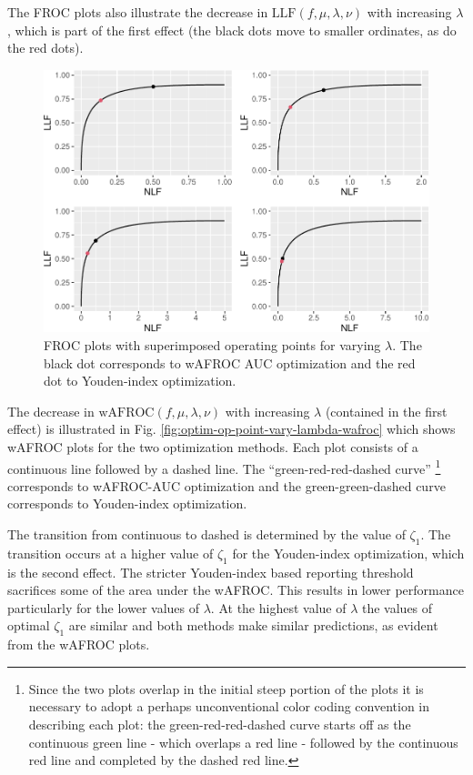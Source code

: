 \documentclass[
]{book}
\begin{document}
The FROC plots also illustrate the decrease in \(\text{LLF} \left ( f, \mu, \lambda, \nu \right )\) with increasing \(\lambda\), which is part of the first effect (the black dots move to smaller ordinates, as do the red dots).

\begin{figure}
\centering
\includegraphics{21-optim-op-point_files/figure-latex/optim-op-point-vary-lambda-froc-1.pdf}
\caption{\label{fig:optim-op-point-vary-lambda-froc}FROC plots with superimposed operating points for varying \(\lambda\). The black dot corresponds to wAFROC AUC optimization and the red dot to Youden-index optimization.}
\end{figure}

The decrease in \(\text{wAFROC} \left ( f, \mu, \lambda, \nu \right )\) with increasing \(\lambda\) (contained in the first effect) is illustrated in Fig. \ref{fig:optim-op-point-vary-lambda-wafroc} which shows wAFROC plots for the two optimization methods. Each plot consists of a continuous line followed by a dashed line. The ``green-red-red-dashed curve'' \footnote{Since the two plots overlap in the initial steep portion of the plots it is necessary to adopt a perhaps unconventional color coding convention in describing each plot: the green-red-red-dashed curve starts off as the continuous green line - which overlaps a red line - followed by the continuous red line and completed by the dashed red line.} corresponds to wAFROC-AUC optimization and the green-green-dashed curve corresponds to Youden-index optimization.

The transition from continuous to dashed is determined by the value of \(\zeta_1\). The transition occurs at a higher value of \(\zeta_1\) for the Youden-index optimization, which is the second effect. The stricter Youden-index based reporting threshold sacrifices some of the area under the wAFROC. This results in lower performance particularly for the lower values of \(\lambda\). At the highest value of \(\lambda\) the values of optimal \(\zeta_1\) are similar and both methods make similar predictions, as evident from the wAFROC plots.
\end{document}
